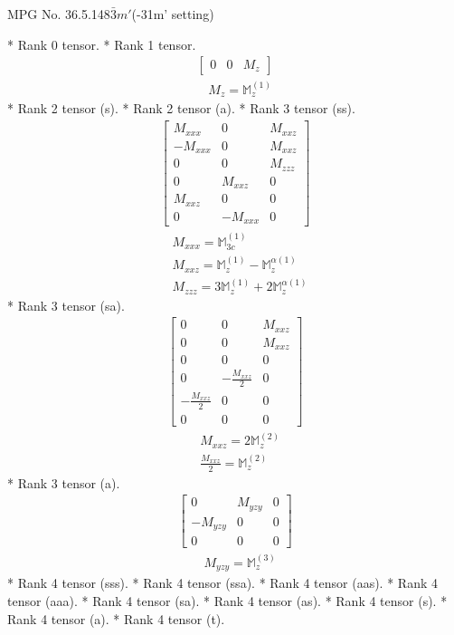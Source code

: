 \documentclass[fleqn,8pt,landscape]{jsarticle}
\begin{document}
\setcounter{MaxMatrixCols}{32}

\renewcommand{\tablename}{Table~}
\renewcommand{\figurename}{Figure~}
\begin{center}
\LARGE
MPG No. 36.5.148\quad$\bar{3}m'$\quad(-31m' setting)
\end{center}
* Rank 0 tensor.
* Rank 1 tensor.
\begin{align*}
\begin{bmatrix} 0 & 0 & M_{z} \end{bmatrix}
\end{align*}
\begin{align*}
& M_{z} = \mathbb{M}_{z}^{(1)}
\end{align*}
* Rank 2 tensor (s).
* Rank 2 tensor (a).
* Rank 3 tensor (ss).
\begin{align*}
\begin{bmatrix} M_{xxx} & 0 & M_{xxz} \\ - M_{xxx} & 0 & M_{xxz} \\ 0 & 0 & M_{zzz} \\ 0 & M_{xxz} & 0 \\ M_{xxz} & 0 & 0 \\ 0 & - M_{xxx} & 0 \end{bmatrix}
\end{align*}
\begin{align*}
& M_{xxx} = \mathbb{M}_{3c}^{(1)} \\
& M_{xxz} = \mathbb{M}_{z}^{(1)} - \mathbb{M}_{z}^{\alpha(1)} \\
& M_{zzz} = 3 \mathbb{M}_{z}^{(1)} + 2 \mathbb{M}_{z}^{\alpha(1)}
\end{align*}
* Rank 3 tensor (sa).
\begin{align*}
\begin{bmatrix} 0 & 0 & M_{xxz} \\ 0 & 0 & M_{xxz} \\ 0 & 0 & 0 \\ 0 & - \frac{M_{xxz}}{2} & 0 \\ - \frac{M_{xxz}}{2} & 0 & 0 \\ 0 & 0 & 0 \end{bmatrix}
\end{align*}
\begin{align*}
& M_{xxz} = 2 \mathbb{M}_{z}^{(2)} \\
& \frac{M_{xxz}}{2} = \mathbb{M}_{z}^{(2)}
\end{align*}
* Rank 3 tensor (a).
\begin{align*}
\begin{bmatrix} 0 & M_{yzy} & 0 \\ - M_{yzy} & 0 & 0 \\ 0 & 0 & 0 \end{bmatrix}
\end{align*}
\begin{align*}
& M_{yzy} = \mathbb{M}_{z}^{(3)}
\end{align*}
* Rank 4 tensor (sss).
* Rank 4 tensor (ssa).
* Rank 4 tensor (aas).
* Rank 4 tensor (aaa).
* Rank 4 tensor (sa).
* Rank 4 tensor (as).
* Rank 4 tensor (s).
* Rank 4 tensor (a).
* Rank 4 tensor (t).
\end{document}
